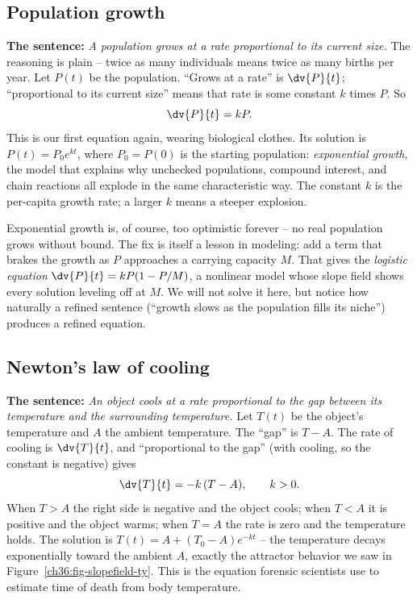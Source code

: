 \subsection{Population growth}

\begin{applicationbox}
\textbf{The sentence:} \emph{A population grows at a rate proportional to its current size.} The reasoning is plain -- twice as many individuals means twice as many births per year. Let $P(t)$ be the population. ``Grows at a rate'' is $\dv{P}{t}$; ``proportional to its current size'' means that rate is some constant $k$ times $P$. So
\[
  \dv{P}{t} = kP.
\]
This is our first equation again, wearing biological clothes. Its solution is $P(t) = P_0 e^{kt}$, where $P_0 = P(0)$ is the starting population: \emph{exponential growth}, the model that explains why unchecked populations, compound interest, and chain reactions all explode in the same characteristic way. The constant $k$ is the per-capita growth rate; a larger $k$ means a steeper explosion.
\end{applicationbox}

Exponential growth is, of course, too optimistic forever -- no real population grows without bound. The fix is itself a lesson in modeling: add a term that brakes the growth as $P$ approaches a carrying capacity $M$. That gives the \emph{logistic equation} $\dv{P}{t} = kP(1 - P/M)$, a nonlinear model whose slope field shows every solution leveling off at $M$. We will not solve it here, but notice how naturally a refined sentence (``growth slows as the population fills its niche'') produces a refined equation.

\subsection{Newton's law of cooling}

\begin{applicationbox}
\textbf{The sentence:} \emph{An object cools at a rate proportional to the gap between its temperature and the surrounding temperature.} Let $T(t)$ be the object's temperature and $A$ the ambient temperature. The ``gap'' is $T - A$. The rate of cooling is $\dv{T}{t}$, and ``proportional to the gap'' (with cooling, so the constant is negative) gives
\[
  \dv{T}{t} = -k\,(T - A), \qquad k > 0.
\]
When $T > A$ the right side is negative and the object cools; when $T < A$ it is positive and the object warms; when $T = A$ the rate is zero and the temperature holds. The solution is $T(t) = A + (T_0 - A)e^{-kt}$ -- the temperature decays exponentially toward the ambient $A$, exactly the attractor behavior we saw in Figure~\ref{ch36:fig-slopefield-ty}. This is the equation forensic scientists use to estimate time of death from body temperature.
\end{applicationbox}

